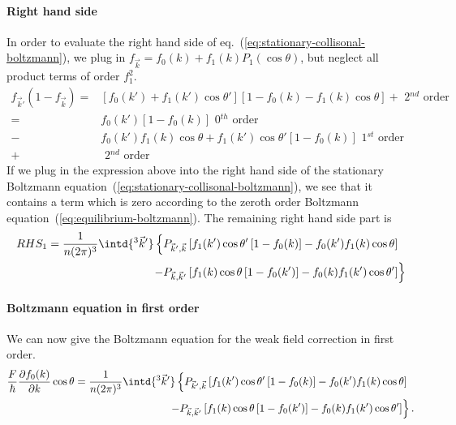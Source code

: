 \documentclass[physics,phd,nolot,nolof]{uccthesis}%
\begin{document}
{\paragraph*{Right hand side}
In order to evaluate the right hand side of eq.~(\ref{eq:stationary-collisonal-boltzmann}), we plug in $f_{\vec k} = f_0(k) +f_1(k)P_1(\cos\theta)$, but neglect all 
product terms of order $f_1^2$.
\[
\begin{split}
f_{\vec k'}(1-f_{\vec k}) =
&\left[ f_0(k') +f_1(k')\cos\theta'\right]
\left[1-f_0(k) -f_1(k)\cos\theta\right] +\text{ 2$^{nd}$ order}\\
=&f_0(k') \left[1-f_0(k)\right] \text{ 0$^{th}$ order}\\
-&f_0(k')f_1(k)\cos\theta
+f_1(k')\cos\theta'\left[1-f_0(k)\right] \text{ 1$^{st}$ order}\\
+&\text{ 2$^{nd}$ order}
\end{split}
\]
If we plug in the expression above into the right hand side of the stationary
Boltzmann equation~(\ref{eq:stationary-collisonal-boltzmann}), we see that 
it contains a term which is zero according to the zeroth order Boltzmann
equation~(\ref{eq:equilibrium-boltzmann}). 
The remaining right hand side part is
\begin{equation}
  \begin{split}
  RHS_1  
  =\frac{1}{n(2\pi)^3} \intd{^3\vec k'}  
  \left\{
  	 P_{\vec k',\vec k}
	 \left[ 
		f_1(k')\cos\theta'\left[1-f_0(k)\right]
	 	-f_0(k')f_1(k)\cos\theta
	\right]\;\; 
		\right.\\ \left.
  	-P_{\vec k,\vec k'}
	 \left[
		f_1(k)\cos\theta\left[1-f_0(k')\right]
		-f_0(k)f_1(k')\cos\theta'
	\right] 
  \right\}
  \end{split}
  \label{eq-Boltzmann-RHS-1}
\end{equation}
\paragraph*{Boltzmann equation in first order}
We can now give the Boltzmann equation for the weak field correction in first order.
\begin{equation}
  \begin{split}
\frac{F}{\hbar} 
  \frac{\partial f_0(k)}{\partial k}\cos\theta
  =\frac{1}{n(2\pi)^3} \intd{^3\vec k'}
  \left\{
  	 P_{\vec k',\vec k}
	 \left[ 
		f_1(k')\cos\theta'\left[1-f_0(k)\right]
	 	-f_0(k')f_1(k)\cos\theta
	\right]\;\; 
		\right.\\ \left.
  	-P_{\vec k,\vec k'}
	 \left[
		f_1(k)\cos\theta\left[1-f_0(k')\right]
		-f_0(k)f_1(k')\cos\theta'
	\right] 
  \right\}.
  \end{split}
  \label{eq:Boltzmann-1}
\end{equation}
}
\end{document}
